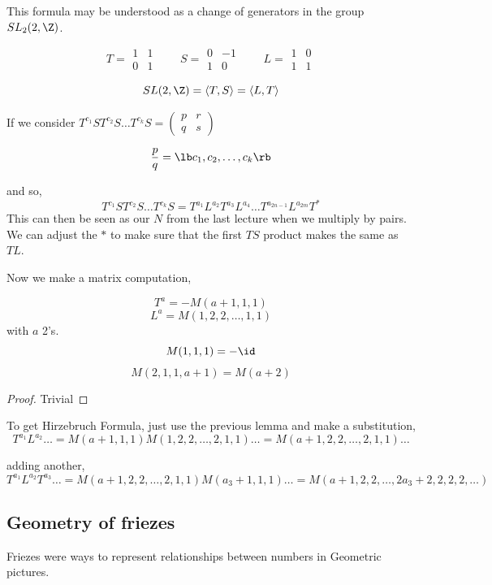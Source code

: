 \documentclass{article}
\begin{document}
This formula may be understood as a change of generators in the group $SL_2(2, \Z)$.

$$ T = \begin{matrix}
  1 & 1 \\ 0 & 1
\end{matrix} \qquad S = \begin{matrix}
  0 & -1 \\ 1 & 0
\end{matrix} \qquad L = \begin{matrix}
  1 & 0 \\ 1 & 1
\end{matrix}$$

\begin{fact}
  $$ SL(2, \Z) = \langle T, S \rangle  = \langle L, T \rangle $$
\end{fact}

If we consider $T^{c_1}ST^{c_2}S\dots T^{c_k}S = \begin{pmatrix}
  p & r \\ q & s
\end{pmatrix}$

\begin{fact}
  $$ \frac{p}{q} = \lb c_1, c_2, \dots, c_k \rb $$
\end{fact}
and so,
$$ T^{c_1}ST^{c_2}S\dots T^{c_k}S = T^{a_1}L^{a_2}T^{a_3}L^{a_4}\dots T^{a_{2n-1}}L^{a_{2m}} T^* $$
This can then be seen as our $N$ from the last lecture when we multiply by pairs. We can adjust the $*$ to make sure that the first $TS$ product makes the same as $TL$.

Now we make a matrix computation,
\begin{nlemma}[]
  $$ T^a = -M(a+1,1,1) $$
  $$ L^a = M(1, 2, 2, \dots, 1, 1) $$
  with $a$ 2's.\\
  $$ M(1, 1, 1) = -\id $$
  $$ M(2, 1,1, a+1) = M(a+2) $$
\end{nlemma}
\begin{proof}
  Trivial
\end{proof}

To get Hirzebruch Formula, just use the previous lemma and make a substitution,
$$ T^{a_1}L^{a_2} \dots = M(a+1, 1, 1) M(1, 2, 2, \dots, 2, 1, 1)\dots = M(a+1, 2, 2, \dots, 2, 1, 1)\dots $$

adding another,
$$ T^{a_1}L^{a_2}T^{a_3} \dots = M(a+1, 2, 2, \dots, 2, 1, 1)M(a_3 + 1, 1, 1)\dots = M(a+1, 2, 2, \dots, 2 a_3 +2, 2, 2, 2, \dots) $$

\newpage
\subsection{Geometry of friezes}
Friezes were ways to represent relationships between numbers in Geometric pictures.
\end{document}
